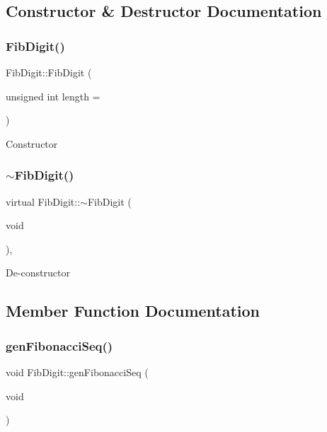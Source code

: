 \subsection{Constructor \& Destructor Documentation}
\mbox{\label{classFibDigit_a5e31b225ec07653382a024d60ac47c68}} 
\subsubsection{\texorpdfstring{Fib\+Digit()}{FibDigit()}}
{\footnotesize\ttfamily Fib\+Digit\+::\+Fib\+Digit (\begin{DoxyParamCaption}\item[{unsigned int}]{length = {} }\end{DoxyParamCaption})\hspace{0.3cm}{\ttfamily [inline]}}

Constructor \mbox{\label{classFibDigit_acd91f7e31add488e19f65675daaca7ea}} 
\subsubsection{\texorpdfstring{$\sim$\+Fib\+Digit()}{~FibDigit()}}
{\footnotesize\ttfamily virtual Fib\+Digit\+::$\sim$\+Fib\+Digit (\begin{DoxyParamCaption}\item[{void}]{ }\end{DoxyParamCaption})\hspace{0.3cm}{\ttfamily [inline]}, {\ttfamily [virtual]}}

De-\/constructor 

\subsection{Member Function Documentation}
\mbox{\label{classFibDigit_a66987864f12e264e1a088c9a394e9bb4}} 
\subsubsection{\texorpdfstring{gen\+Fibonacci\+Seq()}{genFibonacciSeq()}}
{\footnotesize\ttfamily void Fib\+Digit\+::gen\+Fibonacci\+Seq (\begin{DoxyParamCaption}\item[{void}]{ }\end{DoxyParamCaption})\hspace{0.3cm}{\ttfamily [virtual]}}



